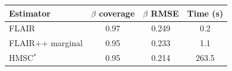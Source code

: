 
\begin{tabular}{lccc}
\toprule
Estimator & $\beta$ coverage & $\beta$ RMSE & Time (s)\\
\midrule
FLAIR & 0.97 & 0.249 & 0.2\\
FLAIR++ marginal & 0.95 & 0.233 & 1.1\\
HMSC$^{*}$ & 0.95 & 0.214 & 263.5\\
\bottomrule
\end{tabular}
